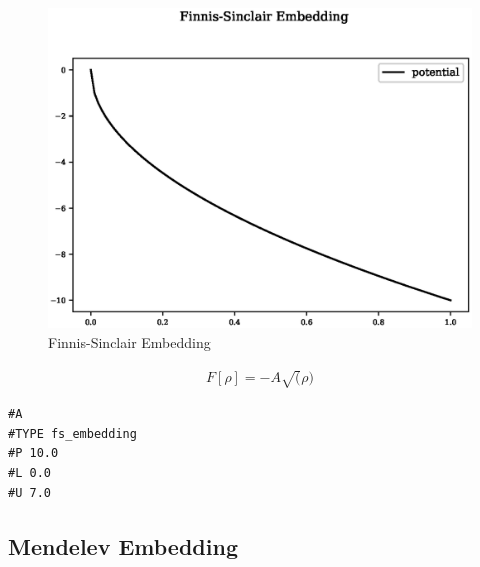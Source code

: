 \begin{figure}[h]
  \begin{center}
    \includegraphics[width=120mm]{appendix/functions/plots/fs_embedding.eps}
    \caption{Finnis-Sinclair Embedding}
    \label{graph:FinnisSinclairEmb}
  \end{center}
\end{figure}

\begin{equation}
\begin{split}
F[\rho] = -A \sqrt(\rho)
\end{split}
\label{eq:fsEmbedding}
\end{equation}

\begin{lstlisting}[style=sPseudo,caption={Finnis-Sinclair Embedding}]
#A
#TYPE fs_embedding
#P 10.0
#L 0.0
#U 7.0
\end{lstlisting}



\clearpage
\FloatBarrier
\subsection{Mendelev Embedding}

